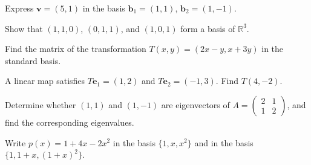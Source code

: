 \begin{chapterexercise}
Express $\mathbf v=(5,1)$ in the basis $\mathbf b_1=(1,1)$, $\mathbf b_2=(1,-1)$.
\end{chapterexercise}
\begin{chapterexercise}
Show that $(1,1,0)$, $(0,1,1)$, and $(1,0,1)$ form a basis of $\mathbb R^3$.
\end{chapterexercise}
\begin{chapterexercise}
Find the matrix of the transformation $T(x,y)=(2x-y,x+3y)$ in the standard basis.
\end{chapterexercise}
\begin{chapterexercise}
A linear map satisfies $T\mathbf e_1=(1,2)$ and $T\mathbf e_2=(-1,3)$. Find $T(4,-2)$.
\end{chapterexercise}
\begin{chapterexercise}
Determine whether $(1,1)$ and $(1,-1)$ are eigenvectors of $A=\begin{pmatrix}2&1\\1&2\end{pmatrix}$, and find the corresponding eigenvalues.
\end{chapterexercise}
\begin{chapterexercise}
Write $p(x)=1+4x-2x^2$ in the basis $\{1,x,x^2\}$ and in the basis $\{1,1+x,(1+x)^2\}$.
\end{chapterexercise}

